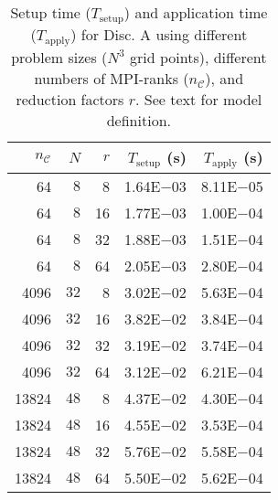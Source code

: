 \documentclass[]{siamart0216}
\begin{document}
\begin{comment}
B           &13824                 &$48$         &32          &1.02E-01 &4.20E-03   \\
B           &13824                 &$48$         &64          &1.30E-01 &7.37E-03   \\
B           &13824                 &$96$         &8            &1.11E-01 &7.68E-03   \\
B           &13824                 &$192$       &8            &2.70E-01 &4.85E-02   \\
B           &13824                 &$384$       &8            &1.24E+00 &3.41E-01   \\
\bottomrule
\end{tabular}
\label{tab:telescope}
\end{table}
\end{comment}

\begin{table}[h!]
\centering
\caption{Setup time ($T_\mathrm{setup}$) and application time ($T_\mathrm{apply}$) for Disc. A using different problem sizes ($N^3$ grid points), different numbers of MPI-ranks ($n_{\mathcal C}$), and reduction factors $r$.
See text for model definition.}
\begin{tabular}{r r r r r}
\toprule
$n_{\mathcal C}$     &$N$    &$r$    &$T_\text{setup}$ (s) &$T_\text{apply}$ (s)\\
\toprule
64                       &$8$         &8            &1.64E$-$03 &8.11E$-$05   \\
64                       &$8$         &16          &1.77E$-$03 &1.00E$-$04   \\
64                       &$8$         &32          &1.88E$-$03 &1.51E$-$04   \\
64                       &$8$         &64          &2.05E$-$03 &2.80E$-$04   \\
\midrule
4096                    &$32$      &8         &3.02E$-$02 &5.63E$-$04   \\
4096                    &$32$      &16       &3.82E$-$02 &3.84E$-$04   \\
4096                    &$32$      &32       &3.19E$-$02 &3.74E$-$04   \\
4096                    &$32$      &64       &3.12E$-$02 &6.21E$-$04   \\
\midrule
13824                  &$48$         &8            &4.37E$-$02 &4.30E$-$04   \\
13824                  &$48$         &16          &4.55E$-$02 &3.53E$-$04   \\
13824                  &$48$         &32          &5.76E$-$02 &5.58E$-$04   \\
13824                  &$48$         &64          &5.50E$-$02 &5.62E$-$04   \\
\bottomrule
\end{tabular}
\label{tab:telescopeA}
\end{table}
\end{document}
